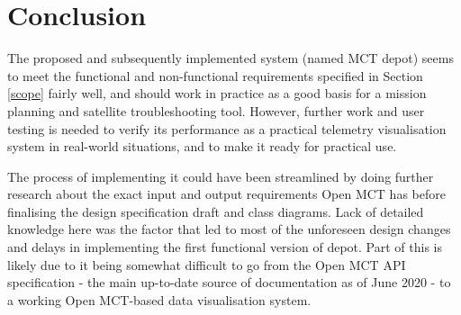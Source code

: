 \begin{comment}

\end{comment}

\section{Conclusion}
The proposed and subsequently implemented system (named MCT \Gls{depot}) seems to meet the functional and non-functional requirements specified in Section \ref{scope} fairly well, and should work in practice as a good basis for a mission planning and satellite troubleshooting tool. However, further work and user testing is needed to verify its performance as a practical telemetry visualisation system in real-world situations, and to make it ready for practical use.

The process of implementing it could have been streamlined by doing further research about the exact input and output requirements Open MCT has before finalising the design specification draft and class diagrams. Lack of detailed knowledge here was the factor that led to most of the unforeseen design changes and delays in implementing the first functional version of \Gls{depot}. Part of this is likely due to it being somewhat difficult to go from the Open MCT API specification - the main up-to-date source of documentation as of June 2020 - to a working Open MCT-based data visualisation system.



